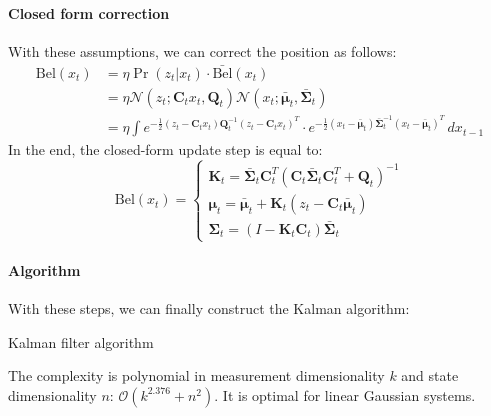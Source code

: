 \paragraph*{Closed form correction}
With these assumptions, we can correct the position as follows:
\begin{align*}
    \text{Bel}(x_t) &=\eta\Pr(z_t|x_t)\cdot\bar{\text{Bel}}(x_t) \\
                    &=\eta\mathcal{N}(z_t;\mathbf{C}_tx_t,\mathbf{Q}_t)\mathcal{N}(x_t;\bar{\boldsymbol{\mu}}_t,\bar{\boldsymbol{\Sigma}}_t) \\
                    &=\eta\int e^{-\frac{1}{2}(z_t-\mathbf{C}_tx_t)\mathbf{Q}_t^{-1}(z_t-\mathbf{C}_tx_t)^T}\cdot e^{-\frac{1}{2}(x_t-\bar{\boldsymbol{\mu}}_t)  \bar{\mathbf{\Sigma}}_t^{-1}   (x_t-\bar{\boldsymbol{\mu}}_t)^T}\,dx_{t-1}
\end{align*}
In the end, the closed-form update step is equal to:
\[\text{Bel}(x_t)=\begin{cases}
    \mathbf{K}_t=\bar{\mathbf{\Sigma}}_t\mathbf{C}_t^T\left(\mathbf{C}_t\bar{\mathbf{\Sigma}}_t\mathbf{C}_t^T+\mathbf{Q}_t\right)^{-1} \\
    \boldsymbol{\mu}_t=\bar{\boldsymbol{\mu}}_t+\mathbf{K}_t(z_t-\mathbf{C}_t\bar{\boldsymbol{\mu}}_t) \\
    \mathbf{\Sigma}_t=(I-\mathbf{K}_t\mathbf{C}_t)\bar{\mathbf{\Sigma}}_t
\end{cases}\]

\paragraph*{Algorithm} 
With these steps, we can finally construct the Kalman algorithm:
\begin{algorithm}[H]
    \caption{Kalman filter algorithm}
        \begin{algorithmic}[1]
             
              
            \State{}
        \end{algorithmic}
\end{algorithm}
The complexity is polynomial in measurement dimensionality $k$ and state dimensionality $n$: $\mathcal{O}(k^{2.376} + n^2)$.
It is optimal for linear Gaussian systems.

